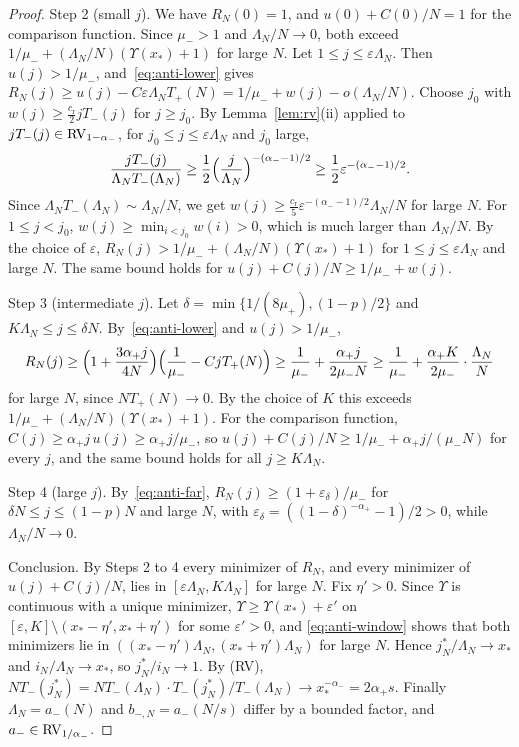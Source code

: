\begin{proof}
Step 2 (small $j$). We have $R_N(0)=1$, and $u(0)+C(0)/N=1$ for the comparison
function. Since $\mu_\minus>1$ and $\Lambda_N/N\to0$, both exceed
$1/\mu_\minus+(\Lambda_N/N)(\Upsilon(x_*)+1)$ for large $N$. Let
$1\le j\le\varepsilon\Lambda_N$. Then $u(j)>1/\mu_\minus$, and~\eqref{eq:anti-lower} gives
$R_N(j)\ge u(j)-C\varepsilon\Lambda_NT_\plus(N)=1/\mu_\minus+w(j)-o(\Lambda_N/N)$. Choose
$j_0$ with $w(j)\ge\frac{c_{\mathrm r}}2jT_\minus(j)$ for $j\ge j_0$. By
Lemma~\ref{lem:rv}(ii) applied to $jT_{-}(j)\in\mathrm{RV}_{1-\alpha_{-}}$,
for $j_0\le j\le\varepsilon\Lambda_N$ and $j_0$ large,
\[
 \frac{jT_{-}(j)}{\Lambda_NT_{-}(\Lambda_N)}\ge\frac12\Bigl(\frac{j}{\Lambda_N}\Bigr)^{-(\alpha_{-}-1)/2}\ge\frac12\varepsilon^{-(\alpha_{-}-1)/2}.
\]
Since $\Lambda_NT_\minus(\Lambda_N)\sim\Lambda_N/N$, we get
$w(j)\ge\frac{c_{\mathrm r}}5\varepsilon^{-(\alpha_\minus-1)/2}\Lambda_N/N$ for large $N$.
For $1\le j<j_0$, $w(j)\ge\min_{i<j_0}w(i)>0$, which is much larger than
$\Lambda_N/N$. By the choice of $\varepsilon$,
$R_N(j)>1/\mu_\minus+(\Lambda_N/N)(\Upsilon(x_*)+1)$ for $1\le j\le\varepsilon\Lambda_N$ and
large $N$. The same bound holds for $u(j)+C(j)/N\ge1/\mu_\minus+w(j)$.

Step 3 (intermediate $j$). Let $\delta=\min\{1/(8\mu_\plus),(1-p)/2\}$ and
$K\Lambda_N\le j\le\delta N$. By~\eqref{eq:anti-lower} and $u(j)>1/\mu_\minus$,
\[
 R_N(j)\ge\Bigl(1+\frac{3\alpha_{+} j}{4N}\Bigr)\Bigl(\frac1{\mu_{-}}-CjT_{+}(N)\Bigr)
 \ge\frac1{\mu_{-}}+\frac{\alpha_{+} j}{2\mu_{-} N}\ge\frac1{\mu_{-}}+\frac{\alpha_{+} K}{2\mu_{-}}\cdot\frac{\Lambda_N}{N}
\]
for large $N$, since $NT_\plus(N)\to0$. By the choice of $K$ this exceeds
$1/\mu_\minus+(\Lambda_N/N)(\Upsilon(x_*)+1)$. For the comparison function,
$C(j)\ge\alpha_\plus j\,u(j)\ge\alpha_\plus j/\mu_\minus$, so
$u(j)+C(j)/N\ge1/\mu_\minus+\alpha_\plus j/(\mu_\minus N)$ for every $j$, and the same bound
holds for all $j\ge K\Lambda_N$.

Step 4 (large $j$). By~\eqref{eq:anti-far}, $R_N(j)\ge(1+\varepsilon_\delta)/\mu_\minus$ for
$\delta N\le j\le(1-p)N$ and large $N$, with $\varepsilon_\delta=((1-\delta)^{-\alpha_\plus}-1)/2>0$, while
$\Lambda_N/N\to0$.

Conclusion. By Steps 2 to 4 every minimizer of $R_N$, and every minimizer of
$u(j)+C(j)/N$, lies in $[\varepsilon\Lambda_N,K\Lambda_N]$ for large $N$. Fix
$\eta'>0$. Since $\Upsilon$ is continuous with a unique minimizer, $\Upsilon\ge\Upsilon(x_*)+\varepsilon'$
on $[\varepsilon,K]\setminus(x_*-\eta',x_*+\eta')$ for some $\varepsilon'>0$, and
\eqref{eq:anti-window} shows that both minimizers lie in
$((x_*-\eta')\Lambda_N,(x_*+\eta')\Lambda_N)$ for large $N$. Hence
$j^*_N/\Lambda_N\to x_*$ and $i_N/\Lambda_N\to x_*$, so $j^*_N/i_N\to1$. By (RV),
$NT_\minus(j^*_N)=NT_\minus(\Lambda_N)\cdot T_\minus(j^*_N)/T_\minus(\Lambda_N)\to x_*^{-\alpha_\minus}=2\alpha_\plus s$.
Finally $\Lambda_N=a_\minus(N)$ and $b_{\minus,N}=a_\minus(N/s)$ differ by a
bounded factor, and $a_{-}\in\mathrm{RV}_{1/\alpha_{-}}$.
\end{proof}

